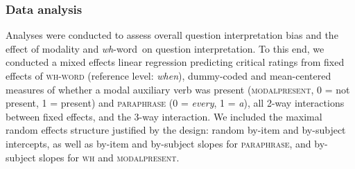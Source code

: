\documentclass[12pt,letterpaper,table,svgnames,dvipsnames]{article}
\newcommand{\whw}{\emph{wh}-word~}
\begin{document}
\subsubsection{Data analysis}
Analyses were conducted to assess overall question interpretation bias and the effect of modality and \whw on question interpretation. To this end, we conducted a mixed effects linear regression predicting critical ratings from fixed effects of \textsc{wh-word} (reference level: \emph{when}), dummy-coded and mean-centered measures of whether a modal auxiliary verb was present (\textsc{modalpresent}, 0 = not present, 1 = present) and \textsc{paraphrase} (0 = \emph{every}, 1 = \emph{a}), all 2-way interactions between fixed effects, and the 3-way interaction. We included the maximal random effects structure justified by the design: random by-item and by-subject intercepts, as well as by-item and by-subject slopes for \textsc{paraphrase}, and by-subject slopes for \textsc{wh} and \textsc{modalpresent}. 
\end{document}
